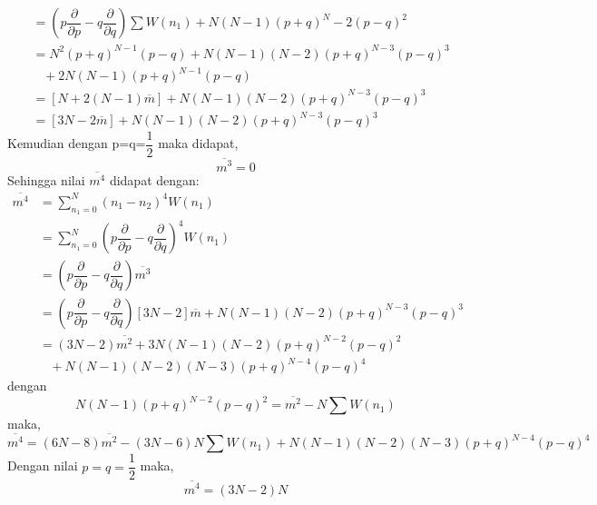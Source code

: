 \begin{enumerate}
\begin{enumerate}[(a)]
\begin{equation*}
\begin{split}
                &=\left(p\dfrac{\partial}{\partial p}-q\dfrac{\partial}{\partial q}\right)\sum W(n_1)+N(N-1)(p+q)^N-2(p-q)^2\\
                &=N^2(p+q)^{N-1}(p-q)+N(N-1)(N-2)(p+q)^{N-3}(p-q)^3\\
                &\;\;\;+2N(N-1)(p+q)^{N-1}(p-q)\\
                &=\left[N+2(N-1)\overline{m}\right]+N(N-1)(N-2)(p+q)^{N-3}(p-q)^3\\
                &=\left[3N-2\overline{m}\right]+N(N-1)(N-2)(p+q)^{N-3}(p-q)^3
            \end{split}
        \end{equation*}
        Kemudian dengan p=q=$\dfrac{1}{2}$ maka didapat,
        \begin{equation*}
            \overline{m^3}=0
        \end{equation*}
        Sehingga nilai $\overline{m^4}$ didapat dengan:
        \begin{equation*}
            \begin{split}
                \overline{m^4}&=\sum_{n_1=0}^N (n_1-n_2)^4 W(n_1)\\
                &=\sum_{n_1=0}^N \left(p\dfrac{\partial}{\partial p}-q\dfrac{\partial}{\partial q}\right)^4 W(n_1)\\
                &=\left(p\dfrac{\partial}{\partial p}-q\dfrac{\partial}{\partial q}\right)\overline{m^3}\\
                &=\left(p\dfrac{\partial}{\partial p}-q\dfrac{\partial}{\partial q}\right)\left[3N-2\right]\overline{m}+N(N-1)(N-2)(p+q)^{N-3}(p-q)^3\\
                &=(3N-2)\overline{m^2}+3N(N-1)(N-2)(p+q)^{N-2}(p-q)^2\\
                &\;\;\;+N(N-1)(N-2)(N-3)(p+q)^{N-4}(p-q)^4
            \end{split}
        \end{equation*}
        dengan 
            \begin{equation*}
                N(N-1)(p+q)^{N-2}(p-q)^2=\overline{m^2}-N\sum W(n_1)
            \end{equation*}
        maka,
        \begin{equation*}
            \overline{m^4}=(6N-8)\overline{m^2}-(3N-6)N\sum W(n_1)+N(N-1)(N-2)(N-3)(p+q)^{N-4}(p-q)^4
        \end{equation*}
        Dengan nilai $p=q=\dfrac{1}{2}$ maka,
        \begin{equation*}
            \overline{m^4}=(3N-2)N

\end{equation*}
\end{enumerate}
\end{enumerate}
